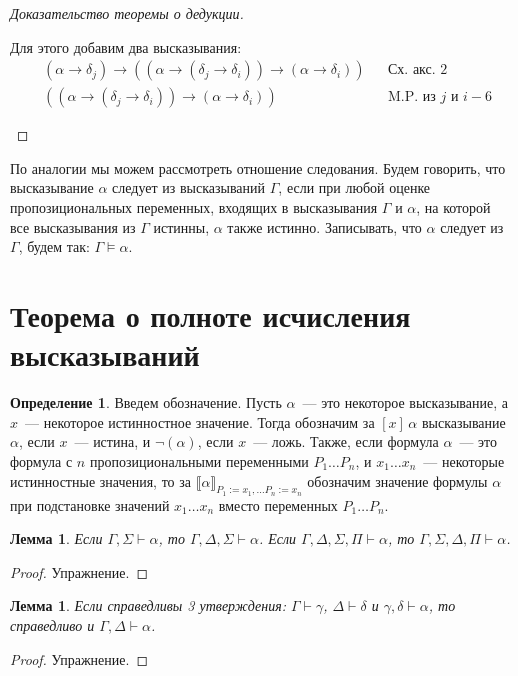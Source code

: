 \documentclass[a4paper,11pt]{article}
\newtheorem{lmm}[thm]{Лемма}
\theoremstyle{definition}
\newtheorem{dfn}[thm]{Определение}
\newcommand{\sem}[2]{\llbracket #1 \rrbracket_{#2}}
\newcommand{\proves}{\vdash}
\begin{document}
\begin{proof}[Доказательство теоремы о дедукции]
\begin{enumerate}
  Для этого добавим два высказывания:
  \begin{align*}
  &(\alpha \to \delta_j) \to ((\alpha \to (\delta_j \to \delta_i)) \to (\alpha \to \delta_i)) &&\text{Сх. акс. 2}\\
  &((\alpha \to (\delta_j \to \delta_i)) \to (\alpha \to \delta_i)) &&\text{M.P. из } j \text{ и } i-6
  \end{align*}
\end{enumerate}
\end{proof}

По аналогии мы можем рассмотреть отношение следования. Будем говорить, что
высказывание $\alpha$ следует из высказываний $\Gamma$, если при любой оценке
пропозициональных переменных, входящих в высказывания $\Gamma$ и $\alpha$, на
которой все высказывания из $\Gamma$ истинны, $\alpha$ также истинно.
Записывать, что $\alpha$ следует из $\Gamma$, будем так: $\Gamma \models \alpha$.

\section{Теорема о полноте исчисления высказываний}
\begin{dfn}
Введем обозначение. Пусть $\alpha$~--- это некоторое высказывание, а $x$~---
некоторое истинностное значение. Тогда обозначим за $[x]\,\alpha$ высказывание
$\alpha$, если $x$~--- истина, и $\neg(\alpha)$, если $x$~--- ложь. Также, если
формула $\alpha$~--- это формула с $n$ пропозициональными переменными $P_1
\dots P_n$, и $x_1 \dots x_n$~--- некоторые истинностные значения, то за
$\sem{\alpha}{P_1:=x_1,\dots P_n:=x_n}$ обозначим значение формулы $\alpha$ при
подстановке значений $x_1 \dots x_n$ вместо переменных $P_1 \dots P_n$.
\end{dfn}

\begin{lmm}
Если $\Gamma, \Sigma \proves \alpha$, то $\Gamma, \Delta, \Sigma \proves
\alpha$. Если $\Gamma, \Delta, \Sigma, \Pi \proves \alpha$, то $\Gamma, \Sigma,
\Delta, \Pi \proves \alpha$.
\end{lmm}
\begin{proof}
Упражнение.
\end{proof}

\begin{lmm}
Если справедливы 3 утверждения: $\Gamma \proves \gamma$, $\Delta \proves
\delta$ и $\gamma, \delta \proves \alpha$, то справедливо и $\Gamma, \Delta
\proves \alpha$.
\end{lmm}
\begin{proof}
Упражнение.
\end{proof}
\end{document}
